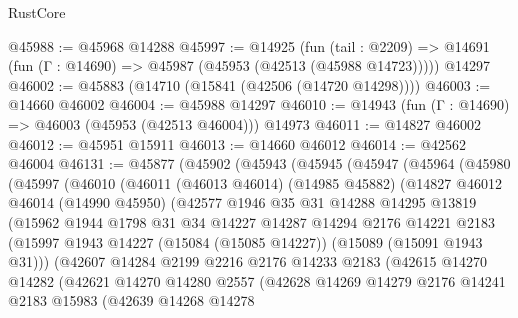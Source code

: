 \begin{lexlean}{RustCore}
\begin{coremodule}
@45988 := @45968 @14288
@45997 := @14925
    (fun (tail : @2209) => @14691 (fun (Γ : @14690) => @45987 (@45953 (@42513 (@45988 @14723)))))
    @14297
@46002 := @45883 (@14710 (@15841 (@42506 (@14720 @14298))))
@46003 := @14660 @46002
@46004 := @45988 @14297
@46010 := @14943 (fun (Γ : @14690) => @46003 (@45953 (@42513 @46004))) @14973
@46011 := @14827 @46002
@46012 := @45951 @15911
@46013 := @14660 @46012
@46014 := @42562 @46004
@46131 := @45877
    (@45902
      (@45943
        (@45945
          (@45947
            (@45964
              (@45980
                (@45997
                  (@46010
                    (@46011
                      (@46013 @46014)
                      (@14985 @45882)
                      (@14827
                        @46012
                        @46014
                        (@14990 @45950)
                        (@42577
                          @1946
                          @35
                          @31
                          @14288
                          @14295
                          @13819
                          (@15962
                            @1944
                            @1798
                            @31
                            @34
                            @14227
                            @14287
                            @14294
                            @2176
                            @14221
                            @2183
                            (@15997
                              @1943
                              @14227
                              (@15084 (@15085 @14227))
                              (@15089 (@15091 @1943 @31)))
                            (@42607
                              @14284
                              @2199
                              @2216
                              @2176
                              @14233
                              @2183
                              (@42615
                                @14270
                                @14282
                                (@42621
                                  @14270
                                  @14280
                                  @2557
                                  (@42628
                                    @14269
                                    @14279
                                    @2176
                                    @14241
                                    @2183
                                    @15983
                                    (@42639
                                      @14268
                                      @14278

\end{coremodule}
\end{lexlean}
